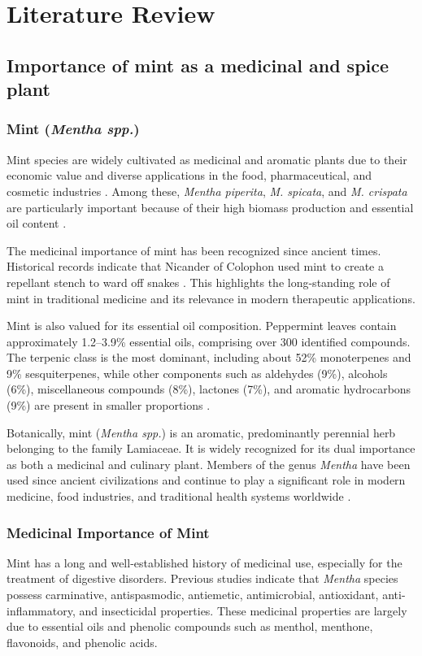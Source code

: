 \chapter{Literature Review}

\section{Importance of mint as a medicinal and spice plant}

\subsection{Mint (\textit{Mentha spp.})}
Mint species are widely cultivated as medicinal and aromatic plants due to their economic value and diverse applications in the food, pharmaceutical, and cosmetic industries \textcite{Zheljazkov2020}. Among these, \textit{Mentha piperita}, \textit{M. spicata}, and \textit{M. crispata} are particularly important because of their high biomass production and essential oil content \textcite{Mahendran2021}.

The medicinal importance of mint has been recognized since ancient times. Historical records indicate that Nicander of Colophon used mint to create a repellant stench to ward off snakes \textcite{Silva2020}. This highlights the long-standing role of mint in traditional medicine and its relevance in modern therapeutic applications.

Mint is also valued for its essential oil composition. Peppermint leaves contain approximately 1.2--3.9\% essential oils, comprising over 300 identified compounds. The terpenic class is the most dominant, including about 52\% monoterpenes and 9\% sesquiterpenes, while other components such as aldehydes (9\%), alcohols (6\%), miscellaneous compounds (8\%), lactones (7\%), and aromatic hydrocarbons (9\%) are present in smaller proportions \textcite{Silva2020}.

Botanically, mint (\textit{Mentha spp.}) is an aromatic, predominantly perennial herb belonging to the family Lamiaceae. It is widely recognized for its dual importance as both a medicinal and culinary plant. Members of the genus \textit{Mentha} have been used since ancient civilizations and continue to play a significant role in modern medicine, food industries, and traditional health systems worldwide \textcite{Silva2020}.

\subsection{Medicinal Importance of Mint}
Mint has a long and well-established history of medicinal use, especially for the treatment of digestive disorders. Previous studies indicate that \textit{Mentha} species possess carminative, antispasmodic, antiemetic, antimicrobial, antioxidant, anti-inflammatory, and insecticidal properties. These medicinal properties are largely due to essential oils and phenolic compounds such as menthol, menthone, flavonoids, and phenolic acids.


